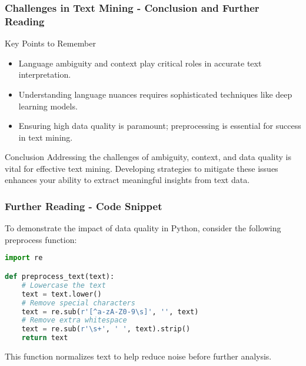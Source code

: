 \documentclass[aspectratio=169]{beamer}
\begin{document}
\begin{frame}[fragile]
    \frametitle{Challenges in Text Mining - Conclusion and Further Reading}
    \begin{block}{Key Points to Remember}
        \begin{itemize}
            \item Language ambiguity and context play critical roles in accurate text interpretation.
            \item Understanding language nuances requires sophisticated techniques like deep learning models.
            \item Ensuring high data quality is paramount; preprocessing is essential for success in text mining.
        \end{itemize}
    \end{block}
    \begin{block}{Conclusion}
        Addressing the challenges of ambiguity, context, and data quality is vital for effective text mining. Developing strategies to mitigate these issues enhances your ability to extract meaningful insights from text data.
    \end{block}
\end{frame}

\begin{frame}[fragile]
    \frametitle{Further Reading - Code Snippet}
    To demonstrate the impact of data quality in Python, consider the following preprocess function:
    \begin{lstlisting}[language=Python]
import re

def preprocess_text(text):
    # Lowercase the text
    text = text.lower()
    # Remove special characters
    text = re.sub(r'[^a-zA-Z0-9\s]', '', text)
    # Remove extra whitespace
    text = re.sub(r'\s+', ' ', text).strip()
    return text
    \end{lstlisting}
    This function normalizes text to help reduce noise before further analysis.
\end{frame}
\end{document}
